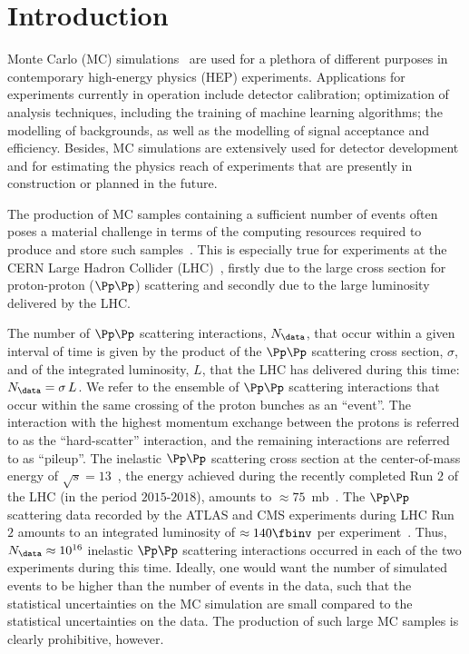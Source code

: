 \section{Introduction}
\label{sec:introduction}

Monte Carlo (MC) simulations~\cite{Kroese2014WhyTM,dunn2011exploring} are used for a plethora of different purposes in contemporary high-energy physics (HEP) experiments.
Applications for experiments currently in operation include detector calibration; optimization of analysis techniques, including the training of machine learning algorithms;
the modelling of backgrounds, as well as the modelling of signal acceptance and efficiency.
Besides, MC simulations are extensively used for detector development and for estimating the physics reach of experiments that are presently in construction or planned in the future.

The production of MC samples containing a sufficient number of events often poses a material challenge 
in terms of the computing resources required to produce and store such samples~\cite{HSFPhysicsEventGeneratorWG:2020gxw}.
This is especially true for experiments at the CERN Large Hadron Collider (LHC)~\cite{Bruning:2004ej,Buning:2004wk,Benedikt:2004wm},
firstly due to the large cross section for proton-proton ($\Pp\Pp$) scattering and secondly due to the large luminosity delivered by the LHC.

The number of $\Pp\Pp$ scattering interactions, $N_{\data}$, that occur within a given interval of time 
is given by the product of the $\Pp\Pp$ scattering cross section, $\sigma$, and of the integrated luminosity, $L$, that the LHC has delivered during this time:
$N_{\data} = \sigma \, L$.
We refer to the ensemble of $\Pp\Pp$ scattering interactions that occur within the same crossing of the proton bunches as an ``event''.
The interaction with the highest momentum exchange between the protons is referred to as the ``hard-scatter'' interaction,
and the remaining interactions are referred to as ``pileup''.
The inelastic $\Pp\Pp$ scattering cross section at the center-of-mass energy of $\sqrt{s}=13$~\TeV, the energy achieved during the recently completed Run $2$ of the LHC (in the period $2015$-$2018$),
amounts to $\approx 75$~mb~\cite{Aaboud:2016mmw,Sirunyan:2018nqx}.
The $\Pp\Pp$ scattering data recorded by the ATLAS and CMS experiments during LHC Run $2$ 
amounts to an integrated luminosity of $\approx 140\fbinv$ per experiment~\cite{ATLAS-CONF-2019-021,LUM-17-001,LUM-17-004,LUM-18-002}.
Thus, $N_{\data} \approx 10^{16}$ inelastic $\Pp\Pp$ scattering interactions occurred in each of the two experiments during this time.
Ideally, one would want the number of simulated events to be higher than the number of events in the data,
such that the statistical uncertainties on the MC simulation are small compared to the statistical uncertainties on the data.
The production of such large MC samples is clearly prohibitive, however.

